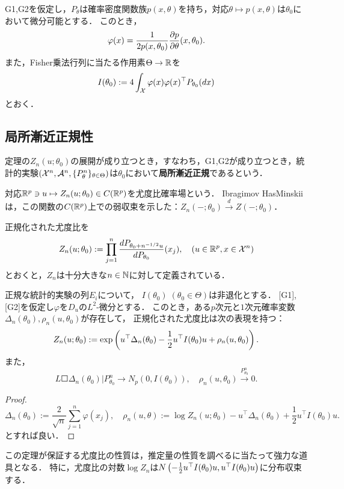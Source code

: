 \documentclass[uplatex,dvipdfmx]{jsreport}
\begin{document}
\begin{lemma}[$L^2$-微分の表示]
    G1,G2を仮定し，$P_\theta$は確率密度関数族$p(x,\theta)$を持ち，対応$\theta\mapsto p(x,\theta)$は$\theta_0$において微分可能とする．
    このとき，
    \[\varphi(x)=\frac{1}{2p(x,\theta_0)}\frac{\partial p}{\partial \theta}(x,\theta_0).\]
    また，Fisher乗法行列に当たる作用素$\Theta\to\mathbb{R}$を
    \[I(\theta_0):=4\int_{\mathcal{X}}\varphi(x)\varphi(x)^\top P_{\theta_0}(dx)\]
    とおく．
\end{lemma}

\begin{lemma}
    
\end{lemma}

\subsection{局所漸近正規性}

\begin{tcolorbox}[colframe=ForestGreen, colback=ForestGreen!10!white,breakable,colbacktitle=ForestGreen!40!white,coltitle=black,fonttitle=\bfseries\sffamily,
title=]
    定理の$Z_n(u;\theta_0)$の展開が成り立つとき，すなわち，G1,G2が成り立つとき，統計的実験$(\mathcal{X}^n,\mathcal{A}^n,\{P^n_\theta\}_{\theta\in\Theta})$は$\theta_0$において\textbf{局所漸近正規}であるという．

    対応$\mathbb{R}^p\ni u\mapsto Z_n(u;\theta_0)\in C(\mathbb{R}^p)$を尤度比確率場という．
    Ibragimov HasMinskiiは，この関数の$C(\mathbb{R}^p)$上での弱収束を示した：$Z_n(-;\theta_0)\xrightarrow{d}Z(-;\theta_0)$．
\end{tcolorbox}

\begin{notation}
    正規化された尤度比を
    \[Z_n(u;\theta_0):=\prod^n_{j=1}\frac{dP_{\theta_0+n^{-1/2}u}}{dP_{\theta_0}}(x_j),\quad(u\in\mathbb{R}^p,x\in\mathcal{X}^n)\]
    とおくと，$Z_n$は十分大きな$n\in\mathbb{N}$に対して定義されている．
\end{notation}

\begin{theorem}[LeCam]
    正規な統計的実験の列$E_i$について，
    $I(\theta_0)\;(\theta_0\in\Theta)$は非退化とする．
    [G1],[G2]を仮定し$\varphi$を$D_u$の$L^2$-微分とする．
    このとき，ある$p$次元と$1$次元確率変数$\Delta_n(\theta_0),\rho_n(u,\theta_0)$が存在して，
    正規化された尤度比は次の表現を持つ：
    \[Z_n(u;\theta_0):=\exp\left(u^\top\Delta_n(\theta_0)-\frac{1}{2}u^\top I(\theta_0)u+\rho_n(u,\theta_0)\right).\]
    また，
    \[L\Square{\Delta_n(\theta_0)|P^n_{\theta_0}}\to N_p(0,I(\theta_0)),\quad\rho_n(u,\theta_0)\xrightarrow{P^n_{\theta_0}}0.\]
\end{theorem}
\begin{proof}
    \[\Delta_n(\theta_0):=\frac{2}{\sqrt{n}}\sum^n_{j=1}\varphi(x_j),\quad\rho_n(u,\theta):=\log Z_n(u;\theta_0)-u^\top\Delta_n(\theta_0)+\frac{1}{2}u^\top I(\theta_0)u.\]
    とすれば良い．
\end{proof}
\begin{remarks}
    この定理が保証する尤度比の性質は，推定量の性質を調べるに当たって強力な道具となる．
    特に，尤度比の対数$\log Z_n$は$N\left(-\frac{1}{2}u^\top I(\theta_0)u,u^\top I(\theta_0)u\right)$に分布収束する．
\end{remarks}
\end{document}
